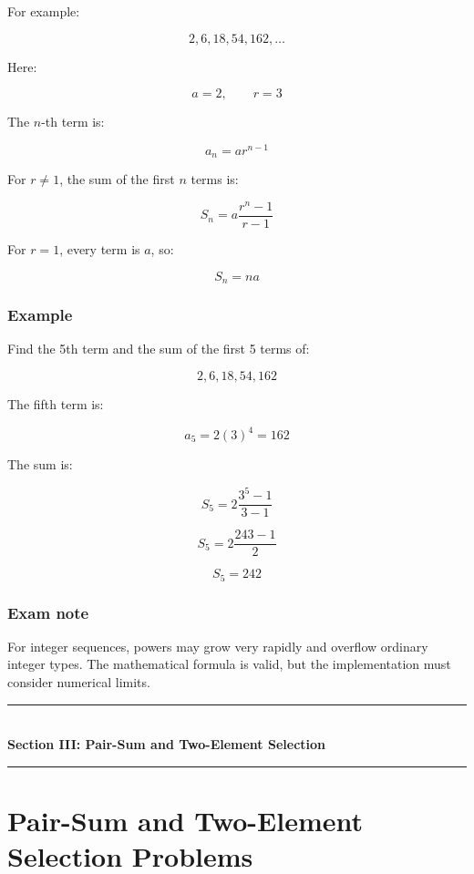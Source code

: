 For example:


\[
2,6,18,54,162,\ldots
\]


Here:


\[
a=2,\qquad r=3
\]


The $n$-th term is:


\[
\boxed{a_n=ar^{n-1}}
\]


For $r\neq1$, the sum of the first $n$ terms is:


\[
\boxed{S_n=a\frac{r^n-1}{r-1}}
\]


For $r=1$, every term is $a$, so:


\[
\boxed{S_n=na}
\]


\subsubsection{Example}

Find the 5th term and the sum of the first 5 terms of:


\[
2,6,18,54,162
\]


The fifth term is:


\[
a_5=2(3)^4=\boxed{162}
\]


The sum is:


\[
S_5=2\frac{3^5-1}{3-1}
\]



\[
S_5=2\frac{243-1}{2}
\]



\[
\boxed{S_5=242}
\]


\subsubsection{Exam note}

For integer sequences, powers may grow very rapidly and overflow ordinary integer types. The mathematical formula is valid, but the implementation must consider numerical limits.


\newpage
\begin{center}
\vspace{0.5em}
{\color{primary}\rule{0.45\textwidth}{1.2pt}}\\[4pt]
{\Large\bfseries\color{primary} Section III: Pair-Sum and Two-Element Selection}\\[2pt]
{\color{primary}\rule{0.45\textwidth}{1.2pt}}
\vspace{0.5em}
\end{center}

\section{Pair-Sum and Two-Element Selection Problems}


